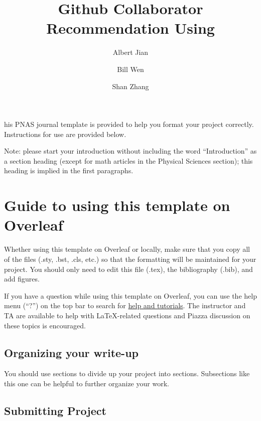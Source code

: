 \documentclass[9pt,twoside]{pnas-new}
\title{Github Collaborator Recommendation Using }
\author[a]{Albert Jian}
\author[a]{Bill Wen}
\author[a]{Shan Zhang}
\affil[a]{University of California, Los Angeles}
\begin{document}
\maketitle
\thispagestyle{firststyle}

his PNAS journal template is provided to help you format your project correctly. Instructions for use are provided below. 

Note: please start your introduction without including the word ``Introduction'' as a section heading (except for math articles in the Physical Sciences section); this heading is implied in the first paragraphs. 

\section*{Guide to using this template on Overleaf}

Whether using this template on Overleaf or locally, make sure that you copy all of the files (.sty, .bst, .cls, etc.) so that the formatting will be maintained for your project. You should only need to edit this file (.tex), the bibliography (.bib), and add figures.

If you have a question while using this template on Overleaf, you can use the help menu (``?'') on the top bar to search for \href{https://www.overleaf.com/help}{help and tutorials}. The instructor and TA are available to help with LaTeX-related questions and Piazza discussion on these topics is encouraged.

\subsection*{Organizing your write-up}

You should use sections to divide up your project into sections. Subsections like this one can be helpful to further organize your work. 

\subsection*{Submitting Project}
\end{document}
